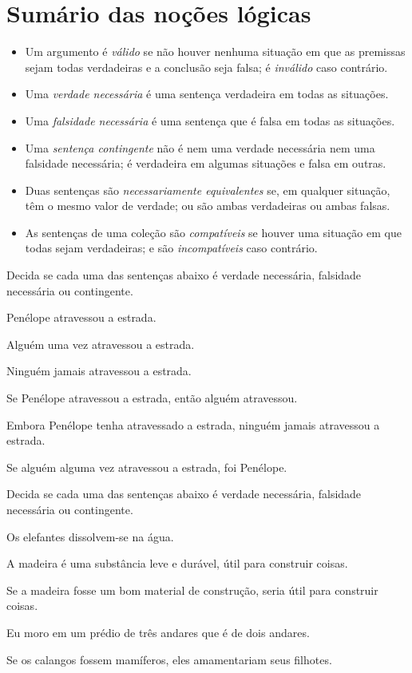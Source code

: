 \section*{Sumário das noções lógicas}

\begin{itemize}
\item Um argumento é \textit{válido} se não houver nenhuma situação em que as premissas sejam todas verdadeiras e a conclusão seja falsa; é \textit{inválido} caso contrário.

\item Uma \textit{verdade necessária} é uma sentença verdadeira em todas as situações.

\item Uma \textit{falsidade necessária} é uma sentença que é falsa em todas as situações.

\item Uma \textit{sentença contingente} não é nem uma verdade necessária nem uma falsidade necessária; é verdadeira em algumas situações e falsa em outras.

\item Duas sentenças são \textit{necessariamente equivalentes} se, em qualquer situação, têm o mesmo valor de verdade; ou são ambas verdadeiras ou ambas falsas.

\item As sentenças de uma coleção são \textit{compatíveis} se houver uma situação em que todas sejam verdadeiras; e são \textit{incompatíveis} caso contrário.
\end{itemize}


\practiceproblems
\problempart
\label{pr.EnglishTautology2}
Decida se cada uma das sentenças abaixo é verdade necessária, falsidade necessária ou contingente.
\begin{earg}
\item Penélope atravessou a estrada.
\item Alguém uma vez atravessou a estrada.
\item Ninguém jamais atravessou a estrada.
\item Se Penélope atravessou a estrada, então alguém atravessou.
\item Embora Penélope tenha atravessado a estrada, ninguém jamais atravessou a estrada.
\item Se alguém alguma vez atravessou a estrada, foi Penélope.
\end{earg}

\problempart
Decida se cada uma das sentenças abaixo é verdade necessária, falsidade necessária ou contingente.
\begin{earg}
\item Os elefantes dissolvem-se na água.
\item A madeira é uma substância leve e durável, útil para construir coisas.
\item Se a madeira fosse um bom material de construção, seria útil para construir coisas.
\item Eu moro em um prédio de três andares que é de dois andares.
\item Se os calangos fossem mamíferos, eles amamentariam seus filhotes.
\end{earg}

